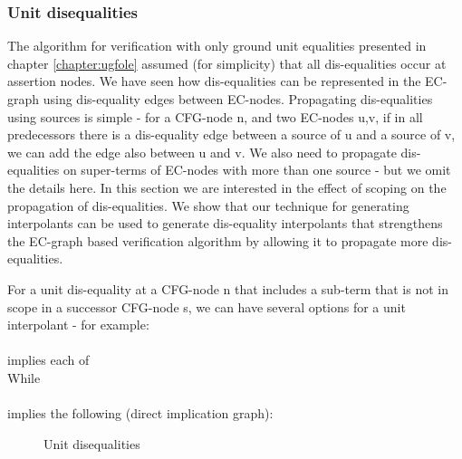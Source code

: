 \subsubsection*{Unit disequalities}
The algorithm for verification with only ground unit equalities presented in chapter \ref{chapter:ugfole} assumed (for simplicity) that all dis-equalities occur at assertion nodes. We have seen how dis-equalities can be represented in the EC-graph using dis-equality edges between EC-nodes. Propagating dis-equalities using sources is simple - for a CFG-node n, and two EC-nodes u,v,  if in all predecessors there is a dis-equality edge between a source of u and a source of v, we can add the edge also between u and v. We also need to propagate dis-equalities on super-terms of EC-nodes with more than one source - but we omit the details here. 
In this section we are interested in the effect of scoping on the propagation of dis-equalities. 
We show that our technique for generating interpolants can be used to generate dis-equality interpolants that strengthens the EC-graph based verification algorithm by allowing it to propagate more dis-equalities.

For a unit dis-equality at a CFG-node n that includes a sub-term that is not in scope in a successor CFG-node s, we can have several options for a unit interpolant - for example:\\
 \\
implies each of \\
While \\
 \\
implies the following (direct implication graph):
\begin{figure}[H]
\caption{
Unit disequalities
}
\label{example_4.2.5}
\end{figure}


